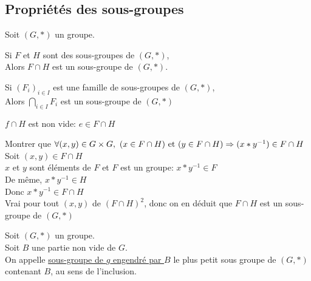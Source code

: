 \documentclass[12pt,twoside,a4paper]{article}
\begin{document}
		\subsection{Propri\'et\'es des sous-groupes}
			\begin{flushleft}
				Soit $(G,*)$ un groupe.
			\end{flushleft}
			\begin{prop}
				\begin{liste}
					\item Si $F$ et $H$ sont des sous-groupes de $(G,*)$,\\
						Alors $F\cap H$ est un sous-groupe de $(G,*)$.
					\item Si $(F_i)_{i\in I}$ est une famille de sous-groupes de $(G,*)$,\\
						Alors $\bigcap\limits_{i\in I}F_i$ est un sous-groupe de $(G,*)$
				\end{liste}
			\end{prop}
\newpage
			\begin{preuve}
				\begin{liste}
					\item $f\cap H$ est non vide: $e\in F\cap H$
					\item Montrer que $\forall (x,y)\in G\times G,\ (x\in F\cap H)\et(y\in F\cap H)\Rightarrow (x*y^{-1})\in F\cap H$\\
						Soit $(x,y)\in F\cap H$\\
						$x$ et $y$ sont \'el\'ements de $F$ et $F$ est un groupe: $x*y^{-1}\in F$\\
						De m\^eme, $x*y^{-1}\in H$\\
						Donc $x*y^{-1}\in F\cap H$\\
						Vrai pour tout $(x,y)$ de $(F\cap H)^2$, donc on en d\'eduit que $F\cap H$ est un sous-groupe de $(G,*)$
				\end{liste}
			\end{preuve}
			\begin{defi}
				Soit $(G,*)$ un groupe.\\
				Soit $B$ une partie non vide de $G$.\\
				On appelle \underline{sous-groupe de $g$ engendr\'e par $B$} le plus petit sous groupe de $(G,*)$ contenant $B$, au sens de l'inclusion.
			\end{defi}
\end{document}
